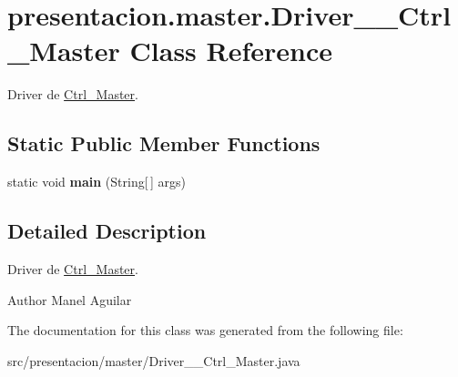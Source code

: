 \hypertarget{classpresentacion_1_1master_1_1Driver____Ctrl__Master}{}\section{presentacion.\+master.\+Driver\+\_\+\+\_\+\+Ctrl\+\_\+\+Master Class Reference}
\label{classpresentacion_1_1master_1_1Driver____Ctrl__Master}


Driver de \hyperlink{classpresentacion_1_1master_1_1Ctrl__Master}{Ctrl\+\_\+\+Master}.  


\subsection*{Static Public Member Functions}
\begin{DoxyCompactItemize}
\item 
\mbox{\label{classpresentacion_1_1master_1_1Driver____Ctrl__Master_a4965d356e9bd0a56c753c3a2d296b7cc}} 
static void {\bfseries main} (String\mbox{[}$\,$\mbox{]} args)
\end{DoxyCompactItemize}


\subsection{Detailed Description}
Driver de \hyperlink{classpresentacion_1_1master_1_1Ctrl__Master}{Ctrl\+\_\+\+Master}. 

\begin{DoxyAuthor}{Author}
Manel Aguilar 
\end{DoxyAuthor}


The documentation for this class was generated from the following file\+:\begin{DoxyCompactItemize}
\item 
src/presentacion/master/Driver\+\_\+\+\_\+\+Ctrl\+\_\+\+Master.\+java\end{DoxyCompactItemize}
